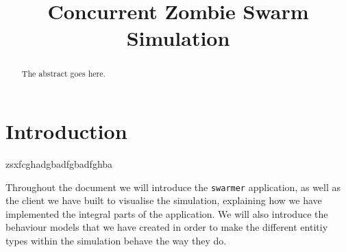 \documentclass[10pt, a4paper, conference, compsocconf]{IEEEtran}
\begin{document}
\title{Concurrent Zombie Swarm Simulation}

\author{
\and
{}
\and
{}
}
\maketitle

\begin{abstract}
The abstract goes here.
\end{abstract}

\section{Introduction \label{intro}}
zsxfcghadgbadfgbadfghba

Throughout the document we will introduce the \verb+swarmer+ application, as well as the client we have built to visualise the simulation, explaining how we have implemented the integral parts of the application. We will also introduce the behaviour models that we have created in order to make the different entitiy types within the simulation behave the way they do.
\end{document}
